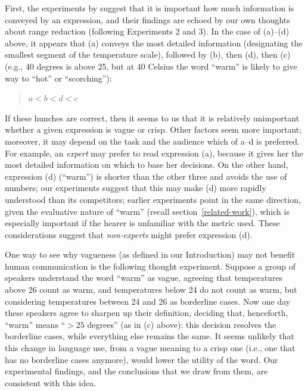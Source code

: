 \documentclass[ %
  graybox       %
 ,envcountchap  %
 ,sectrefs      %
]{svmono}
\begin{document}
First, the experiments by \citeauthor{Mishra01042011} suggest that it is important how much information is conveyed by an expression, and their findings are echoed by our own thoughts about range reduction (following Experiments 2 and 3). In the case of (a)--(d) above, it appears that (a) conveys the most detailed information (designating the smallest segment of the temperature scale), followed by (b), then (d), then (c) (e.g., 40 degrees is above 25, but at 40 Celsius the word ``warm'' is likely to give way to ``hot'' or ``scorching''):
%
\begin{quote}
$a < b < d < c$
\end{quote}
%
If these hunches are correct, then it seems to us that it is relatively unimportant whether a given expression is vague or crisp. Other factors seem more important; moreover, it may depend on the task and the audience which of a--d is preferred. For example, an \emph{expert} may prefer to read expression (a), because it gives her the most detailed information on which to base her decisions. On the other hand, expression (d) (``warm'') is shorter than the other three and avoids the use of numbers; our experiments suggest that this may make (d) more rapidly understood than its competitors; earlier experiments point in the same direction, given the evaluative nature of ``warm'' (recall section~\ref{related-work}), which is especially important if the hearer is unfamiliar with the metric used. These considerations suggest that {\em non-experts} might prefer expression (d).

One way to see why vagueness (as defined in our Introduction) may not benefit human communication is the following thought experiment. Suppose a group of speakers understand the word ``warm'' as vague, agreeing that temperatures above 26 count as warm, and temperatures below 24 do not count as warm, but considering temperatures between 24 and 26 as borderline cases. Now one day these speakers agree to sharpen up their definition, deciding that, henceforth, ``warm'' means ``$>25$ degrees'' (as in (c) above): this decision resolves the borderline cases, while everything else remains the same. It seems unlikely that this change in language use, from a vague meaning to a crisp one (i.e., one that has no borderline cases anymore), would lower the utility of the word. Our experimental findings, and the conclusions that we draw from them, are consistent with this idea.

\backmatter


\backmatter
\end{document}
